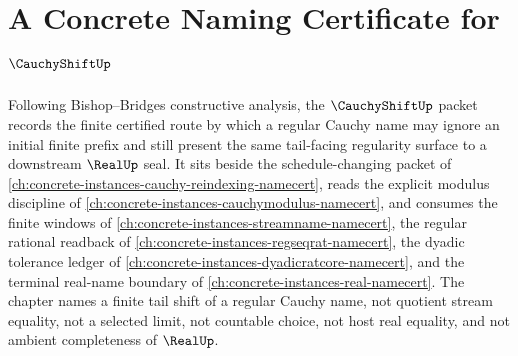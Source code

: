 \chapter{A Concrete Naming Certificate for $\CauchyShiftUp$}
\label{ch:concrete-instances-cauchyshift-namecert}

Following Bishop--Bridges constructive analysis, the $\CauchyShiftUp$ packet records the finite certified route by which a regular Cauchy name may ignore an initial finite prefix and still present the same tail-facing regularity surface to a downstream $\RealUp$ seal. It sits beside the schedule-changing packet of \autoref{ch:concrete-instances-cauchy-reindexing-namecert}, reads the explicit modulus discipline of \autoref{ch:concrete-instances-cauchymodulus-namecert}, and consumes the finite windows of \autoref{ch:concrete-instances-streamname-namecert}, the regular rational readback of \autoref{ch:concrete-instances-regseqrat-namecert}, the dyadic tolerance ledger of \autoref{ch:concrete-instances-dyadicratcore-namecert}, and the terminal real-name boundary of \autoref{ch:concrete-instances-real-namecert}. The chapter names a finite tail shift of a regular Cauchy name, not quotient stream equality, not a selected limit, not countable choice, not host real equality, and not ambient completeness of $\RealUp$.

